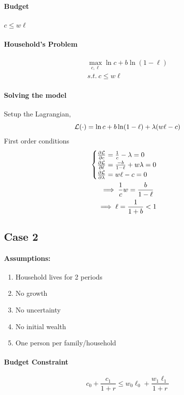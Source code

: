 \documentclass[11pt]{article}
\begin{document}
				\paragraph{Budget} $c \leq w \ell$
				\paragraph{Household's Problem}
				\begin{gather}
					\max_{c, \ell} \ln c + b \ln (1-\ell) \\
					s.t.\ c \leq w\ell
				\end{gather}
				\paragraph{Solving the model} Setup the Lagrangian,
				\begin{equation}
					\mathcal{{L}}(\cdot) = \ln c + b \ln (1-\ell) + \lambda (w \ell - c)
				\end{equation}
				First order conditions
				\begin{gather}
					\begin{cases}
						\frac{\partial{\mathcal{{L}}}}{\partial{c}} = \frac{1}{c} - \lambda = 0 \\
						\frac{\partial{\mathcal{{L}}}}{\partial{\ell}} = \frac{-b}{1-\ell} + w \lambda = 0 \\
						\frac{\partial{\mathcal{{L}}}}{\partial{\lambda}} = w\ell - c = 0
					\end{cases} \\
					\implies \frac{1}{c} w = \frac{b}{1-\ell} \\
					\implies \ell = \frac{1}{1+b} < 1
				\end{gather}
			
			\subsection{Case 2}
				\paragraph{Assumptions:}
					\begin{enumerate}
						\item Household lives for 2 periods
						\item No growth
						\item No uncertainty
						\item No initial wealth
						\item One person per family/household
					\end{enumerate}
				\paragraph{Budget Constraint}
					\begin{equation}
						c_0 + \frac{c_1}{1+r} \leq w_0 \ell_0 + \frac{w_1 \ell_1}{1+r}
					\end{equation}
				
\end{document}
